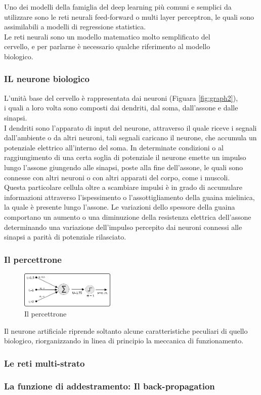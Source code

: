 \documentclass[10pt,a4paper]{article}
\begin{document}
Uno dei modelli della famiglia del deep learning più comuni e semplici da utilizzare sono le reti neurali feed-forward o multi layer perceptron, le quali sono assimilabili a modelli di regressione statistica.\\
Le reti neurali sono un modello matematico molto semplificato del\\ cervello, e per parlarne è necessario qualche riferimento al modello \\biologico.

\subsubsection*{IL neurone biologico}
L'unità base del cervello è rappresentata dai neuroni (Figuara \ref{fig:graph2}),\\ i quali a loro volta sono composti dai dendriti, dal soma, dall'assone e dalle sinapsi. 
\\I dendriti sono l'apparato di input del neurone, attraverso il quale riceve i segnali dall'ambiente o da altri neuroni, tali segnali caricano il neurone, che accumula un potenziale elettrico all'interno del soma.
In determinate condizioni o al raggiungimento di una certa soglia di potenziale il neurone emette un impulso lungo l'assone giungendo alle sinapsi, poste alla fine dell'assone, le quali sono connesse con altri neuroni o con altri apparati del corpo, come i muscoli.\\
Questa particolare cellula oltre a scambiare impulsi è in grado di accumulare informazioni attraverso l'ispessimento o l'assottigliamento della guaina mielinica, la quale è presente lungo l'assone.
Le variazioni dello spessore della guaina comportano un aumento o una diminuzione della resistenza elettrica dell'assone determinando una variazione dell'impulso percepito dai neuroni connessi alle sinapsi a parità di potenziale rilasciato.   

\newpage

\subsubsection*{Il percettrone} 

\begin{figure}
	\centering
	\vspace{-15pt}
    \includegraphics[width=0.4\textwidth]{percettrone.png}
  	\vspace{-17pt}
  	\caption{Il percettrone}
  	\label{fig:graph3}
  	\vspace{-10pt}
\end{figure}

Il neurone artificiale riprende soltanto alcune caratteristiche peculiari di quello biologico, riorganizzando in linea di principio la meccanica di funzionamento.

\subsubsection*{Le reti multi-strato} 

\subsubsection{La funzione di addestramento: Il back-propagation} 
\end{document}

